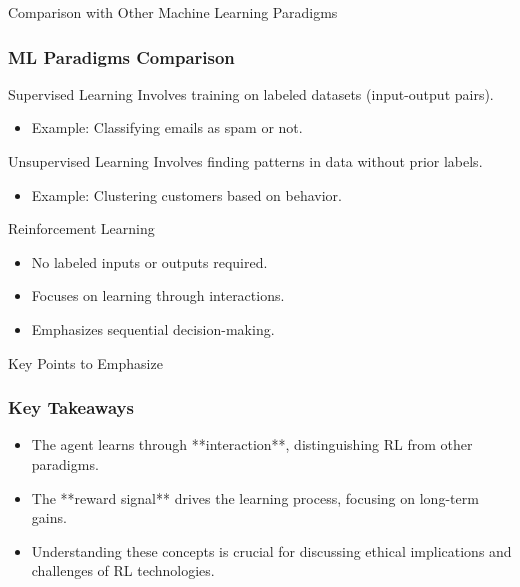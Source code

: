 \documentclass[aspectratio=169]{beamer}
\begin{document}
\begin{frame}[fragile]{Comparison with Other Machine Learning Paradigms}
    \frametitle{ML Paradigms Comparison}
    \begin{block}{Supervised Learning}
        Involves training on labeled datasets (input-output pairs).
        \begin{itemize}
            \item Example: Classifying emails as spam or not.
        \end{itemize}
    \end{block}
    
    \begin{block}{Unsupervised Learning}
        Involves finding patterns in data without prior labels.
        \begin{itemize}
            \item Example: Clustering customers based on behavior.
        \end{itemize}
    \end{block}
    
    \begin{block}{Reinforcement Learning}
        \begin{itemize}
            \item No labeled inputs or outputs required.
            \item Focuses on learning through interactions.
            \item Emphasizes sequential decision-making.
        \end{itemize}
    \end{block}
\end{frame}

\begin{frame}[fragile]{Key Points to Emphasize}
    \frametitle{Key Takeaways}
    \begin{itemize}
        \item The agent learns through **interaction**, distinguishing RL from other paradigms.
        \item The **reward signal** drives the learning process, focusing on long-term gains.
        \item Understanding these concepts is crucial for discussing ethical implications and challenges of RL technologies.
    \end{itemize}
\end{frame}
\end{document}
